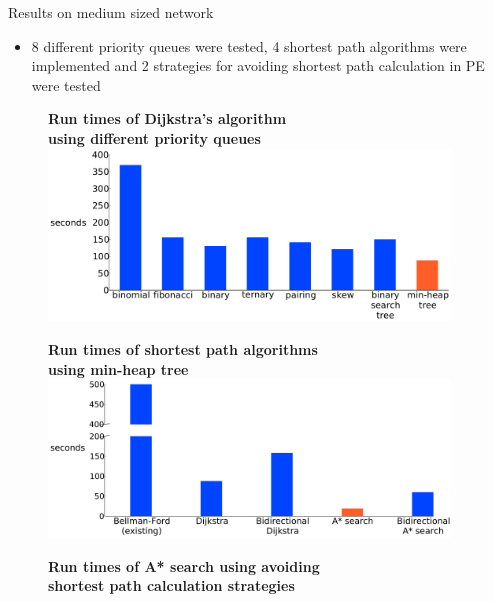 \documentclass[final]{beamer}
\begin{document}
\begin{frame}{ }
\begin{columns}[t]
\begin{column}{.4\linewidth}
    \end{column}
    \begin{column}{.26\linewidth}
        \begin{block}{Results on medium sized network}
            \begin{itemize}
                \itemsep.4em
                \item 8 different priority queues were tested, 4 shortest path algorithms were implemented and 2 strategies for avoiding shortest path calculation in PE were tested
            \end{itemize}
            \begin{figure}
                \centering
                {\bfseries \qquad Run times of Dijkstra's algorithm\\ \qquad using different priority queues}
                \includegraphics[width=\linewidth]{img/pq_runtime}
            \end{figure}
            \begin{figure}
                \centering
                {\bfseries \qquad Run times of shortest path algorithms\\ using min-heap tree}
                \includegraphics[width=\linewidth]{img/runtime}
            \end{figure}
            \begin{figure}
                \centering
                {\bfseries \qquad Run times of A* search using avoiding\\ \qquad shortest path calculation strategies}

\end{figure}
\end{block}
\end{column}
\end{columns}
\end{frame}
\end{document}

